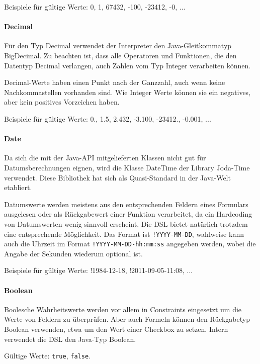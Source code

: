 Beispiele für gültige Werte: 0, 1, 67432, -100, -23412, -0, ...


\paragraph{Decimal}

Für den Typ Decimal verwendet der Interpreter den Java-Gleit\-kom\-ma\-typ BigDecimal. Zu beachten ist, dass alle Operatoren und Funktionen, die den Datentyp Decimal verlangen, auch Zahlen vom Typ Integer verarbeiten können.

Decimal-Werte haben einen Punkt nach der Ganzzahl, auch wenn keine Nachkommastellen vorhanden sind. Wie Integer Werte können sie ein negatives, aber kein positives Vorzeichen haben.

Beispiele für gültige Werte: 0., 1.5, 2.432, -3.100, -23412., -0.001, ...


\paragraph*{Date}

Da sich die mit der Java-API mitgelieferten Klassen nicht gut für Datumsberechnungen eignen, wird die Klasse DateTime der Library Joda-Time\cite{wwwJodaTime} verwendet. Diese Bibliothek hat sich als Quasi-Standard in der Java-Welt etabliert.

Datumswerte werden meistens aus den entsprechenden Feldern eines Formulars ausgelesen oder als Rückgabewert einer Funktion verarbeitet, da ein Hardcoding von Datumswerten wenig sinnvoll erscheint. Die DSL bietet natürlich trotzdem eine entsprechende Möglichkeit. Das Format ist \texttt{!YYYY-MM-DD}, wahlweise kann auch die Uhrzeit im Format \texttt{!YYYY-MM-DD-hh:mm:ss} angegeben werden, wobei die Angabe der Sekunden wiederum optional ist.

Beispiele für gültige Werte: !1984-12-18, !2011-09-05-11:08, ...


\paragraph*{Boolean}

Boolesche Wahrheitswerte werden vor allem in Constraints eingesetzt um die Werte von Feldern zu überprüfen. Aber auch Formeln können den Rückgabetyp Boolean verwenden, etwa um den Wert einer Checkbox zu setzen. Intern verwendet die DSL den Java-Typ Boolean.

Gültige Werte: \texttt{true}, \texttt{false}.



